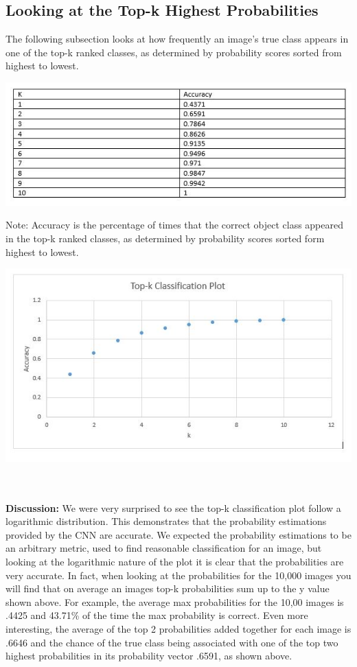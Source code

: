 \documentclass[11pt,english]{article}
\begin{document}
\subsection{Looking at the Top-k Highest Probabilities}
	The following subsection looks at how frequently an image's true class appears in one of the top-k ranked classes, as determined by probability scores sorted from highest to lowest.
\begin{center}
	\includegraphics[scale=0.8]{topktable}

\end{center}
	Note: Accuracy is the percentage of times that the correct object class appeared in the top-k ranked classes, as determined by probability scores sorted form highest to lowest. 
	~\\
\begin{center}
	\includegraphics[scale=0.8]{topkplot}
	~\\~\\
\end{center}
\textbf{Discussion:}
      We were very surprised to see the top-k classification plot follow a logarithmic distribution. This demonstrates that the probability estimations provided by the CNN are accurate. We expected the probability estimations to be an arbitrary metric, used to find reasonable classification for an image, but looking at the logarithmic nature of the plot it is clear that the probabilities are very accurate. In fact, when looking at the probabilities for the 10,000 images you will find that on average an images top-k probabilities sum up to the y value shown above. For example, the average max probabilities for the 10,00 images is .4425 and 43.71\% of the time the max probability is correct. Even more interesting, the average of the top 2 probabilities added together for each image is .6646 and the chance of the true class being associated with one of the top two highest probabilities in its probability vector .6591, as shown above.
\end{document}

